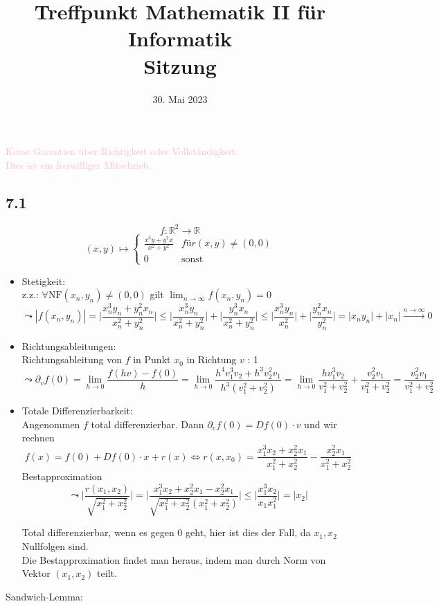 \documentclass[
    accentcolor=pink,
    boxarc,
    dark_mode,
    logofile=enmpty
]{rubos-tuda-template}
\date{30. Mai 2023}
\title[trans rights <3]{Treffpunkt Mathematik II für Informatik \\ Sitzung \getSheetnumber{}}
\begin{document}
    \maketitle{}

    \begin{anmerkung}
        \huge{\textcolor{pink}{Keine Garantien über Richtigkeit oder Vollständigkeit. \\ Dies ist ein freiwilliger Mitschrieb.}}
    \end{anmerkung}

    \subsection*{7.1}
    \[f: \mathbb{R}^2 \to \mathbb{R}\]
    \[(x,y) \mapsto \begin{cases}
            \frac{x^3y+y^2x}{x^2+y^2} & für (x,y) \ne (0,0) \\
            0                         & \text{sonst}
        \end{cases}\]
    \begin{itemize}
        \item[] Stetigkeit:\\
            z.z.: \(\forall \text{NF} (x_n,y_n) \ne (0,0)\) gilt \(\lim_{n \to \infty}f(x_n,y_n) = 0\)
            \[\leadsto |f(x_n,y_n)| = \bigl| \frac{x_n^3y_n+y_n^2x_n}{x_n^2+y_n^2}\bigr| \le \bigl| \frac{x_n^3y_n}{x_n^2+y_n^2} \bigr| + \bigl| \frac{y_n^3x_n}{x_n^2+y_n^2} \bigr| \le \bigl| \frac{x_n^3y_n}{x_n^2} \bigr| + \bigl| \frac{y_n^2x_n}{y_n^2} \bigr| = \bigl| x_ny_n \bigr| + \bigl| x_n \bigr| \overset{n \to \infty}{\longrightarrow} 0\]
        \item[] Richtungsableitungen:\\
            Richtungsableitung von $f$ in Punkt $x_0$ in Richtung $v$ : 1
            \[\leadsto \partial_vf(0) = \lim_{h \to 0} \frac{f(hv)-f(0)}{h} = \lim_{h \to 0} \frac{h^4v_1^3v_2 + h^3v_2^2v_1}{h^3(v_1^2+ v_2^2)} = \lim_{h \to 0} \frac{hv_1^3v_2}{v_1^2+ v_2^2} + \frac{v_2^2v_1}{v_1^2+ v_2^2} =\frac{v_2^2v_1}{v_1^2+ v_2^2}\]
        \item[] Totale Differenzierbarkeit:\\
            Angenommen $f$ total differenzierbar. Dann \(\partial_vf(0) = Df(0) \cdot v\) und wir rechnen
            \[f(x) = f(0) + Df(0) \cdot x + r(x) \Leftrightarrow r(x,x_0) = \frac{x_1^3x_2 + x_2^2x_1}{x_1^2+x_2^2} - \frac{x_2^2x_1}{x_1^2+x_2^2}\]
            Bestapproximation
            \[\leadsto \bigl|\frac{r(x_1,x_2)}{\sqrt{x_1^2+x_2^2}}\bigr| = \bigr|\frac{x_1^3x_2+x_2^2x_1-x_2^2x_1}{\sqrt{x_1^2+x_2^2}(x_1^2+x_2^2)}\bigl| \le \bigr|\frac{x_1^3x_2}{x_1x_1^2}\bigl| = |x_2|\]
            \begin{anmerkungen}
                Total differenzierbar, wenn es gegen 0 geht, hier ist dies der Fall, da $x_1,x_2$ Nullfolgen sind.\\
                Die Bestapproximation findet man heraus, indem man durch Norm von Vektor $(x_1,x_2)$ teilt.
            \end{anmerkungen}
    \end{itemize}
    Sandwich-Lemma:
\end{document}
